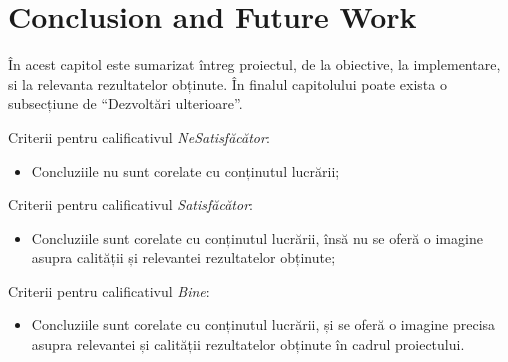 \documentclass[12pt,a4paper]{report}
\begin{document}
\chapter{Conclusion and Future Work}
În acest capitol este sumarizat întreg proiectul, de la obiective, la implementare, si la relevanta rezultatelor obținute. În finalul capitolului poate exista o subsecțiune de ``Dezvoltări ulterioare''.

Criterii pentru calificativul \textit{Ne\textit{Satisfăcător}}: 
\begin{itemize}
	\item	Concluziile nu sunt corelate cu conținutul lucrării;
\end{itemize}

Criterii pentru calificativul \textit{Satisfăcător}: 
\begin{itemize}
	\item	Concluziile sunt corelate cu conținutul lucrării, însă nu se oferă o imagine asupra calității și relevantei rezultatelor obținute;
\end{itemize}

Criterii pentru calificativul \textit{Bine}: 
\begin{itemize}
	\item	Concluziile sunt corelate cu conținutul lucrării, și se oferă o imagine precisa asupra relevantei și calității rezultatelor obținute în cadrul proiectului. 
\end{itemize}



\end{document}
